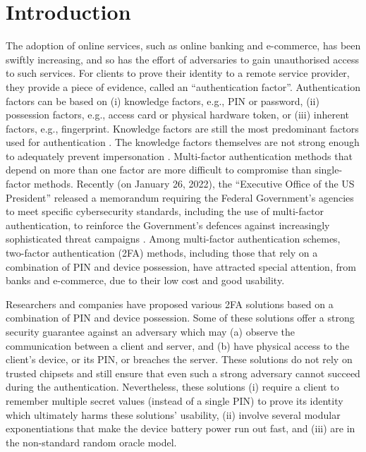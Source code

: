 


\section{Introduction}

The adoption of online services, such as online banking and e-commerce, has been swiftly increasing, and so has the effort of adversaries to gain unauthorised access to such services.  For clients to prove their identity to a remote service provider, they provide a piece of evidence, called an ``authentication factor''. Authentication factors can be based on (i) knowledge factors, e.g., PIN or password, (ii)  possession factors, e.g., access card or physical hardware token, or (iii) inherent factors, e.g., fingerprint.  
%
Knowledge factors are still the most predominant factors used for authentication \cite{bonneau2010password,JacommeK21}. 
%
%
 The knowledge factors themselves are not strong enough to adequately prevent impersonation 
 \cite{SinigagliaCCZ20,JacommeK21}.  Multi-factor authentication methods that depend on more than one factor are more difficult to compromise than single-factor methods. Recently (on January 26, 2022), the ``Executive Office of the US President'' released a memorandum requiring
the Federal Government's agencies to meet specific cybersecurity standards, including the use of multi-factor authentication, to reinforce the Government’s defences against increasingly sophisticated threat campaigns \cite{Zero-Trust-Cybersecurity}. 
% 
Among multi-factor authentication schemes, two-factor authentication (2FA) methods, including those that rely on a combination of PIN and device possession, have attracted special attention, from banks and e-commerce, due to their low cost and good usability. %
%


Researchers and companies have proposed various 2FA solutions based on a combination of PIN and device possession. Some of these solutions offer a strong security guarantee against an adversary which may (a) observe the communication between a client and server, and (b) have physical access to the client's device, or its PIN, or breaches the server. These solutions do not rely on trusted chipsets and still ensure that even such a strong adversary cannot succeed during the authentication. Nevertheless, these solutions (i) require a client to remember multiple secret values (instead of a single PIN)  to prove its identity which ultimately harms these solutions' usability, (ii) involve several modular exponentiations that make the device battery power run out fast, and (iii) are in the non-standard random oracle model. 

